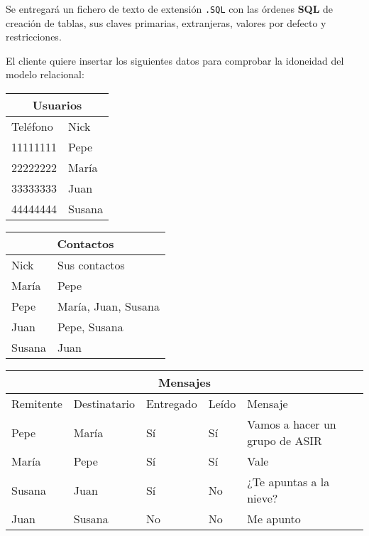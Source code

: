 \begin{homeworkProblem}
  Se entregará un fichero de texto de extensión \texttt{.SQL} con las órdenes \textbf{SQL} de creación de tablas, sus claves primarias, extranjeras, valores por defecto y restricciones.

\end{homeworkProblem}



\begin{homeworkProblem}

  El cliente quiere insertar los siguientes datos para comprobar la idoneidad del modelo relacional:
  
  \begin{tabular}{|l|l|}
    \hline
    \multicolumn{2}{|c|}{Usuarios} \\
    \hline
    Teléfono & Nick \\
    \hline
    11111111 & Pepe \\
    22222222 & María \\
    33333333 & Juan \\
    44444444 & Susana \\
    \hline
  \end{tabular}
  \begin{tabular}{|l|l|}
    \hline
    \multicolumn{2}{|c|}{Contactos} \\
    \hline
    Nick & Sus contactos\\
    \hline
    María & Pepe \\
    Pepe & María, Juan, Susana \\
    Juan & Pepe, Susana \\
    Susana & Juan \\
    \hline
  \end{tabular}
  
  \begin{tabular}{|l|l|l|l|l|}
    \hline
    \multicolumn{5}{|c|}{Mensajes} \\
    \hline
    Remitente & Destinatario & Entregado & Leído & Mensaje \\
    \hline
    Pepe & María & Sí & Sí & Vamos a hacer un grupo de ASIR \\
    María & Pepe & Sí & Sí & Vale \\
    Susana & Juan & Sí & No & ¿Te apuntas a la nieve? \\
    Juan & Susana & No & No & Me apunto \\
    \hline
  \end{tabular}
  

\end{homeworkProblem}
